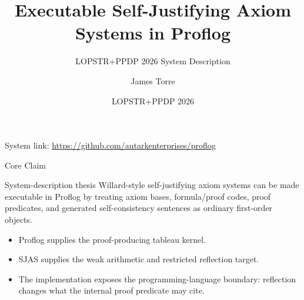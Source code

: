 \documentclass[aspectratio=169]{beamer}
\title[Executable SJAS in Proflog]{Executable Self-Justifying Axiom Systems in Proflog}
\subtitle{LOPSTR+PPDP 2026 System Description}
\author{James Torre}
\institute{\texttt{jpt4@proton.me}}
\date{LOPSTR+PPDP 2026}
\begin{document}
\begin{frame}
  \titlepage
  \vspace{-1.1em}
  \begin{center}
    \small System link: \url{https://github.com/autarkenterprises/proflog}
  \end{center}
\end{frame}

\begin{frame}{Core Claim}
  \begin{block}{System-description thesis}
    Willard-style self-justifying axiom systems can be made executable in
    Proflog by treating axiom bases, formula/proof codes, proof predicates,
    and generated self-consistency sentences as ordinary first-order objects.
  \end{block}

  \vspace{0.6em}
  \begin{itemize}
    \item Proflog supplies the proof-producing tableau kernel.
    \item SJAS supplies the weak arithmetic and restricted reflection target.
    \item The implementation exposes the programming-language boundary:
          reflection changes what the internal proof predicate may cite.
  \end{itemize}
\end{frame}
\end{document}
